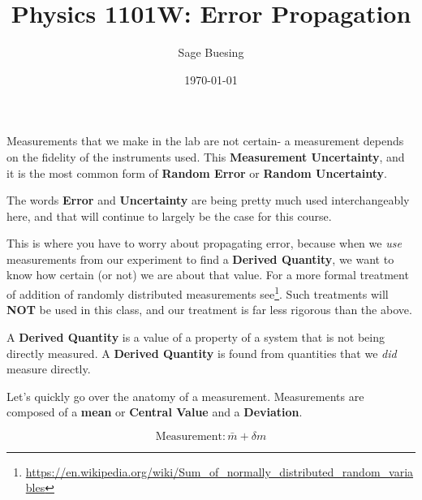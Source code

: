 \documentclass{article}
\title{Physics 1101W: Error Propagation}
\author{\color{SeaGreen} Sage Buesing}
\date{\today}
\begin{document}
\maketitle

Measurements that we make in the lab are not certain- a measurement depends on the fidelity of the instruments used.
This \textbf{Measurement Uncertainty}, and it is the most common form of \textbf{Random Error} or \textbf{Random Uncertainty}.



\begin{note}
  The words \textbf{Error} and \textbf{Uncertainty} are being pretty much used interchangeably here, and that will continue to largely be the case for this course.
\end{note}

This is where you have to worry about propagating error, because when we \emph{use} measurements from our experiment to find a \textbf{Derived Quantity}, we want to know how certain (or not) we are about that value. For a more formal treatment of addition of randomly distributed measurements see\footnote{\url{https://en.wikipedia.org/wiki/Sum_of_normally_distributed_random_variables}}. Such treatments will \textbf{NOT} be used in this class, and our treatment is far less rigorous than the above.


\begin{definition}
  A \textbf{Derived Quantity} is a value of a property of a system that is not being directly measured. A \textbf{Derived Quantity} is found from quantities that we \emph{did} measure directly.
\end{definition}

Let's quickly go over the anatomy of a measurement. Measurements are composed of a \textbf{mean} or \textbf{Central Value} and a \textbf{Deviation}.

\begin{equation}
  \mathrm{Measurement} : \bar{m}+\delta m\label{eq:measurement}
\end{equation}
\end{document}
